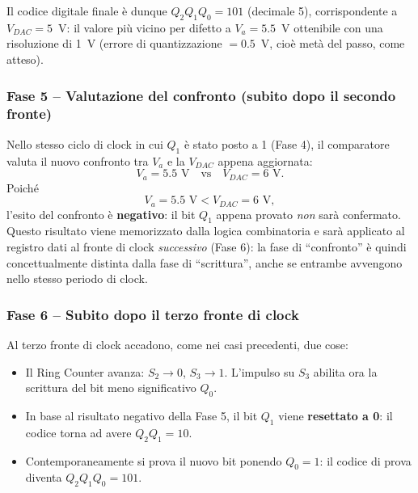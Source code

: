 \documentclass[11pt,a4paper]{report}
\begin{document}
Il codice digitale finale \`e dunque $Q_2Q_1Q_0 = 101$ (decimale 5), corrispondente a $V_{DAC}=5$~V: il valore pi\`u vicino per difetto a $V_a=5.5$~V ottenibile con una risoluzione di 1~V (errore di quantizzazione $=0.5$~V, cio\`e met\`a del passo, come atteso).


\subsubsection{Fase 5 -- Valutazione del confronto (subito dopo il secondo fronte)}

Nello stesso ciclo di clock in cui $Q_1$ è stato posto a 1 (Fase 4), il comparatore valuta il nuovo confronto tra $V_a$ e la $V_{DAC}$ appena aggiornata:
\[
V_a = 5.5\text{ V} \quad \text{vs} \quad V_{DAC} = 6\text{ V}.
\]
Poich\'e
\[
V_a = 5.5\text{ V} < V_{DAC} = 6\text{ V},
\]
l'esito del confronto è \textbf{negativo}: il bit $Q_1$ appena provato \emph{non} sar\`a confermato. Questo risultato viene memorizzato dalla logica combinatoria e sar\`a applicato al registro dati al fronte di clock \emph{successivo} (Fase 6): la fase di ``confronto'' è quindi concettualmente distinta dalla fase di ``scrittura'', anche se entrambe avvengono nello stesso periodo di clock.

\bigskip
\subsubsection{Fase 6 -- Subito dopo il terzo fronte di clock}

Al terzo fronte di clock accadono, come nei casi precedenti, due cose:

\begin{itemize}
    \item Il Ring Counter avanza: $S_2\to 0$, $S_3\to 1$. L'impulso su $S_3$ abilita ora la scrittura del bit meno significativo $Q_0$.
    \item In base al risultato negativo della Fase 5, il bit $Q_1$ viene \textbf{resettato a 0}: il codice torna ad avere $Q_2Q_1 = 10$.
    \item Contemporaneamente si prova il nuovo bit ponendo $Q_0=1$: il codice di prova diventa $Q_2Q_1Q_0 = 101$.
\end{itemize}
\end{document}
